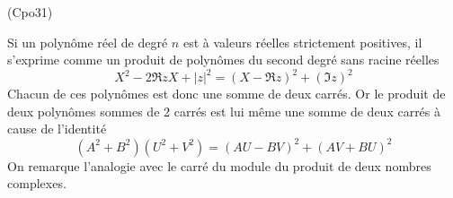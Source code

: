 \begin{tiny}(Cpo31)\end{tiny} Si un polynôme réel de degré $n$ est à valeurs réelles strictement positives, il s'exprime comme un produit de polynômes du second degré sans racine réelles
\begin{displaymath}
  X^2 -2 \Re z X + |z|^2 = (X-\Re z)^2 + (\Im z)^2
\end{displaymath}
Chacun de ces polynômes est donc une somme de deux carrés. Or le produit de deux polynômes sommes de 2 carrés est lui même une somme de deux carrés à cause de l'identité
\begin{displaymath}
  (A^2 + B^2)(U^2 + V^2) = (AU - BV)^2 + (AV + BU)^2
\end{displaymath}
On remarque l'analogie avec le carré du module du produit de deux nombres complexes.